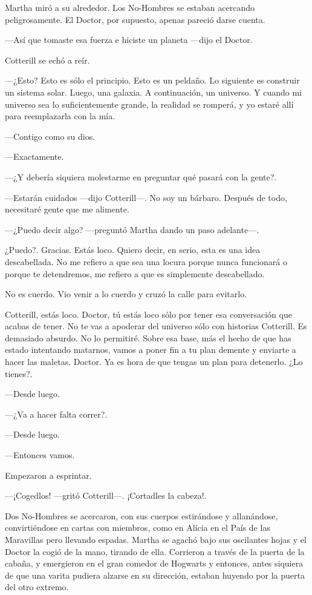 Martha miró a su alrededor. Los No-Hombres se estaban acercando peligrosamente. El Doctor, por supuesto, apenas pareció darse cuenta.

---Así que tomaste esa fuerza e hiciste un planeta ---dijo el Doctor.

Cotterill se echó a reír.

---¿Esto? Esto es sólo el principio. Esto es un peldaño. Lo siguiente es construir un sistema solar. Luego, una galaxia. A continuación, un universo. Y cuando mi universo sea lo suficientemente grande, la realidad se romperá, y yo estaré allí para reemplazarla con la mía.

---Contigo como su dios.

---Exactamente.

---¿Y debería siquiera molestarme en preguntar qué pasará con la gente?.

---Estarán cuidados ---dijo Cotterill---. No soy un bárbaro. Después de todo, necesitaré gente que me alimente.

---¿Puedo decir algo? ---preguntó Martha dando un paso adelante---.

¿Puedo?. Gracias. Estás loco. Quiero decir, en serio, esta es una idea descabellada. No me refiero a que sea una locura porque nunca funcionará o porque te detendremos, me refiero a que es simplemente descabellado.

No es cuerdo. Vio venir a lo cuerdo y cruzó la calle para evitarlo.

Cotterill, estás loco. Doctor, tú estás loco sólo por tener esa conversación que acabas de tener. No te vas a apoderar del universo sólo con historias Cotterill. Es demasiado absurdo. No lo permitiré. Sobre esa base, más el hecho de que has estado intentando matarnos, vamos a poner fin a tu plan demente y enviarte a hacer las maletas. Doctor. Ya es hora de que tengas un plan para detenerlo. ¿Lo tienes?.

---Desde luego.

---¿Va a hacer falta correr?.

---Desde luego.

---Entonces vamos.

Empezaron a esprintar.

---¡Cogedlos! ---gritó Cotterill---. ¡Cortadles la cabeza!.

Dos No-Hombres se acercaron, con sus cuerpos estirándose y allanándose, convirtiéndose en cartas con miembros, como en Alícia en el País de las Maravillas pero llevando espadas. Martha se agachó bajo sus oscilantes hojas y el Doctor la cogió de la mano, tirando de ella. Corrieron a través de la puerta de la cabaña, y emergieron en el gran comedor de Hogwarts y entonces, antes siquiera de que una varita pudiera alzarse en su dirección, estaban huyendo por la puerta del otro extremo.

